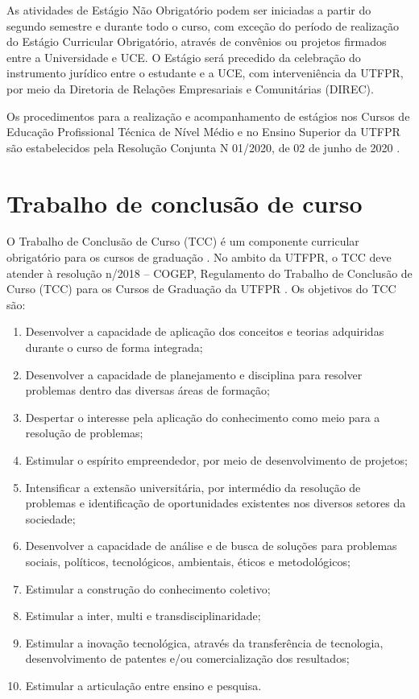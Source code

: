 As atividades de Estágio Não Obrigatório podem ser iniciadas a partir do segundo semestre e durante todo o curso, com exceção do período de realização do Estágio Curricular Obrigatório, através de convênios ou projetos firmados entre a Universidade e UCE. O Estágio será precedido da celebração do instrumento jurídico entre o estudante e a UCE, com interveniência da UTFPR, por meio da Diretoria de Relações Empresariais e Comunitárias (DIREC).

Os procedimentos para a realização e acompanhamento de estágios nos Cursos de Educação Profissional Técnica de Nível Médio e no Ensino Superior da UTFPR são estabelecidos pela Resolução Conjunta N\textordmasculine{} 01/2020, de 02 de junho de 2020 \cite{cogepcoemp1:2020}.


\section{Trabalho de conclusão de curso}

O Trabalho de Conclusão de Curso (TCC) é um componente curricular obrigatório para os cursos de graduação \cite{dcneng}. No ambito da UTFPR, o TCC deve atender à resolução n/2018 – COGEP, Regulamento do Trabalho de Conclusão de Curso (TCC) para os Cursos de Graduação da UTFPR \cite{cogep18}. Os objetivos do TCC são:

\begin{enumerate}
	\item Desenvolver a capacidade de aplicação dos conceitos e teorias adquiridas durante o curso de forma integrada;
	\item Desenvolver a capacidade de planejamento e disciplina para resolver problemas dentro das diversas áreas de formação;
	\item Despertar o interesse pela aplicação do conhecimento como meio para a resolução de problemas;
	\item Estimular o espírito empreendedor, por meio de desenvolvimento de projetos;
	\item Intensificar a extensão universitária, por intermédio da resolução de problemas e identificação de oportunidades existentes nos diversos setores da sociedade;
	\item Desenvolver a capacidade de análise e de busca de soluções para problemas sociais, políticos, tecnológicos, ambientais, éticos e metodológicos;
	\item Estimular a construção do conhecimento coletivo; 
	\item Estimular a inter, multi e transdisciplinaridade;
	\item Estimular a inovação tecnológica, através da transferência de tecnologia, desenvolvimento de patentes e/ou comercialização dos resultados;
	\item Estimular a articulação entre ensino e pesquisa.  
		
\end{enumerate}

